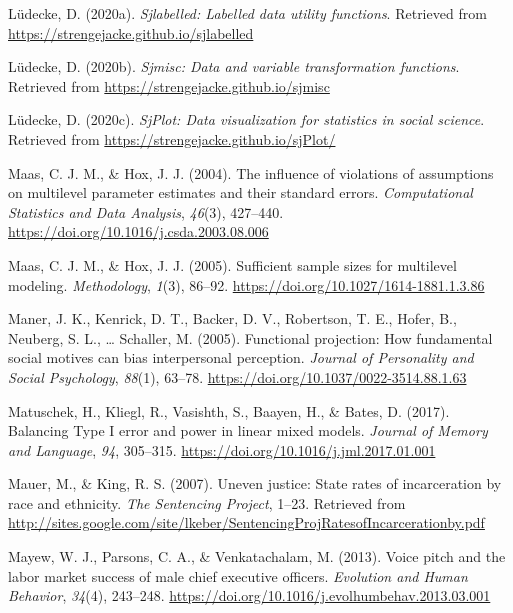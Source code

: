 \documentclass[
  english,
  man, noextraspace,floatsintext]{apa6}
\newlength{\cslhangindent}
\newenvironment{cslreferences}%
  {\setlength{\parindent}{0pt}%
  \everypar{\setlength{\hangindent}{\cslhangindent}}\ignorespaces}%
  {\par}
\begin{document}
\begin{cslreferences}
\leavevmode\hypertarget{ref-R-sjlabelled}{}%
Lüdecke, D. (2020a). \emph{Sjlabelled: Labelled data utility functions}. Retrieved from \url{https://strengejacke.github.io/sjlabelled}

\leavevmode\hypertarget{ref-R-sjmisc}{}%
Lüdecke, D. (2020b). \emph{Sjmisc: Data and variable transformation functions}. Retrieved from \url{https://strengejacke.github.io/sjmisc}

\leavevmode\hypertarget{ref-R-sjPlot}{}%
Lüdecke, D. (2020c). \emph{SjPlot: Data visualization for statistics in social science}. Retrieved from \url{https://strengejacke.github.io/sjPlot/}

\leavevmode\hypertarget{ref-Maas2004}{}%
Maas, C. J. M., \& Hox, J. J. (2004). The influence of violations of assumptions on multilevel parameter estimates and their standard errors. \emph{Computational Statistics and Data Analysis}, \emph{46}(3), 427--440. \url{https://doi.org/10.1016/j.csda.2003.08.006}

\leavevmode\hypertarget{ref-Maas2005}{}%
Maas, C. J. M., \& Hox, J. J. (2005). Sufficient sample sizes for multilevel modeling. \emph{Methodology}, \emph{1}(3), 86--92. \url{https://doi.org/10.1027/1614-1881.1.3.86}

\leavevmode\hypertarget{ref-Maner2005}{}%
Maner, J. K., Kenrick, D. T., Backer, D. V., Robertson, T. E., Hofer, B., Neuberg, S. L., \ldots{} Schaller, M. (2005). Functional projection: How fundamental social motives can bias interpersonal perception. \emph{Journal of Personality and Social Psychology}, \emph{88}(1), 63--78. \url{https://doi.org/10.1037/0022-3514.88.1.63}

\leavevmode\hypertarget{ref-Matuschek2017}{}%
Matuschek, H., Kliegl, R., Vasishth, S., Baayen, H., \& Bates, D. (2017). Balancing Type I error and power in linear mixed models. \emph{Journal of Memory and Language}, \emph{94}, 305--315. \url{https://doi.org/10.1016/j.jml.2017.01.001}

\leavevmode\hypertarget{ref-Mauer2007}{}%
Mauer, M., \& King, R. S. (2007). Uneven justice: State rates of incarceration by race and ethnicity. \emph{The Sentencing Project}, 1--23. Retrieved from \url{http://sites.google.com/site/lkeber/SentencingProjRatesofIncarcerationby.pdf}

\leavevmode\hypertarget{ref-Mayew2013}{}%
Mayew, W. J., Parsons, C. A., \& Venkatachalam, M. (2013). Voice pitch and the labor market success of male chief executive officers. \emph{Evolution and Human Behavior}, \emph{34}(4), 243--248. \url{https://doi.org/10.1016/j.evolhumbehav.2013.03.001}


\end{cslreferences}
\end{document}
